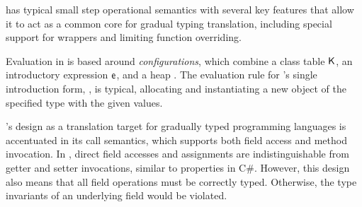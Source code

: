 \documentclass[a4paper,USenglish]{tex/lipics-v2016}
\begin{document}
\kafka has typical small step operational semantics with several key
features that allow it to act as a common core for gradual typing
translation, including special support for wrappers and limiting function
overriding.

Evaluation in \kafka is based around \emph{configurations}, which combine a
class table ${\sf{K}}$, an introductory expression ${\sf{e}}$, and a heap \s. The
evaluation rule for \kafka's single introduction form, , is typical,
allocating and instantiating a new object of the specified type with the
given values.

\kafka's design as a translation target for gradually typed programming
languages is accentuated in its call semantics, which supports both field
access and method invocation. In \kafka, direct field accesses and
assignments are indistinguishable from getter and setter invocations,
similar to properties in C\#. However, this design also means that all field
operations must be correctly typed. Otherwise, the type invariants of an
underlying field would be violated.




%
%
\end{document}
